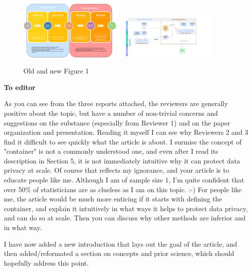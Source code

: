 \begin{figure}[hbt]
\includegraphics[width=0.45\textwidth]{figs/SyntheticDataCycle.png}
\includegraphics[width=0.45\textwidth]{figs/SSB Flow.png}
\caption{\label{fig:comparision}Old and new Figure 1}
\end{figure}

\newpage
\textbf{To editor} 

\begin{referee}
As you can see from the three reports attached,
the reviewers are generally positive about the topic, but have a number of non-trivial concerns and
suggestions on the substance (especially from Reviewer 1) and on the paper organization and
presentation. Reading it myself I can see why Reviewers 2 and 3 find it difficult to see quickly what the
article is about. I surmise the concept of "container" is not a commonly understood one, and even
after I read its description in Section 5, it is not immediately intuitive why it can protect data privacy at
scale. Of course that reflects my ignorance, and your article is to educate people like me. Although I
am of sample size 1, I'm quite confident that over 50\% of statisticians are as clueless as I am on this
topic. :-)
For people like me, the article would be much more enticing if it starts with defining the container,
and explain it intuitively in what ways it helps to protect data privacy, and can do so at scale. Then
you can discuss why other methods are inferior and in what way. 
\end{referee}

\begin{response}
    I have now added a new introduction that lays out the goal of the article, and then added/reformated a section on concepts and prior science, which should hopefully address this point.
\end{response}

